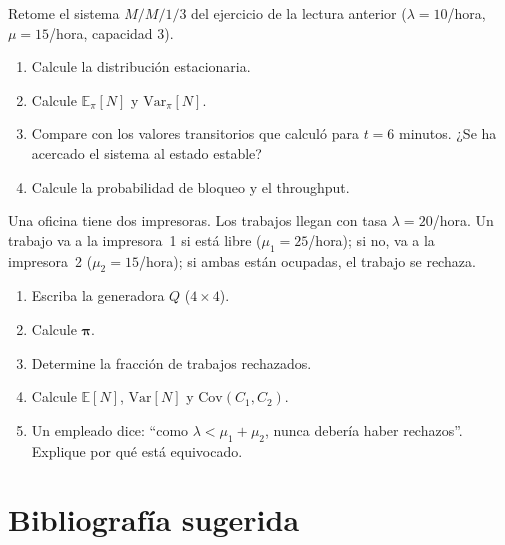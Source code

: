 \documentclass[11pt,a4paper]{article}
\theoremstyle{definition}
\theoremstyle{remark}
\newcommand{\E}{\mathbb{E}}
\newcommand{\Var}{\mathrm{Var}}
\newcommand{\Cov}{\mathrm{Cov}}
\begin{document}
\begin{ejercicio}
Retome el sistema $M/M/1/3$ del ejercicio de la lectura anterior
($\lambda=10$/hora, $\mu=15$/hora, capacidad 3).

\begin{enumerate}[label=(\alph*)]
  \item Calcule la distribución estacionaria.
  \item Calcule $\E_\pi[N]$ y $\Var_\pi[N]$.
  \item Compare con los valores transitorios que calculó para $t=6$
        minutos.  ¿Se ha acercado el sistema al estado estable?
  \item Calcule la probabilidad de bloqueo y el throughput.
\end{enumerate}
\end{ejercicio}

\begin{ejercicio}
Una oficina tiene dos impresoras.  Los trabajos llegan con tasa
$\lambda=20$/hora.  Un trabajo va a la impresora~1 si está libre
($\mu_1=25$/hora); si no, va a la impresora~2 ($\mu_2=15$/hora); si
ambas están ocupadas, el trabajo se rechaza.

\begin{enumerate}[label=(\alph*)]
  \item Escriba la generadora $Q$ ($4\times 4$).
  \item Calcule $\boldsymbol{\pi}$.
  \item Determine la fracción de trabajos rechazados.
  \item Calcule $\E[N]$, $\Var[N]$ y $\Cov(C_1,C_2)$.
  \item Un empleado dice: ``como $\lambda<\mu_1+\mu_2$, nunca debería
        haber rechazos''.  Explique por qué está equivocado.
\end{enumerate}
\end{ejercicio}


\section*{Bibliografía sugerida}
\end{document}
